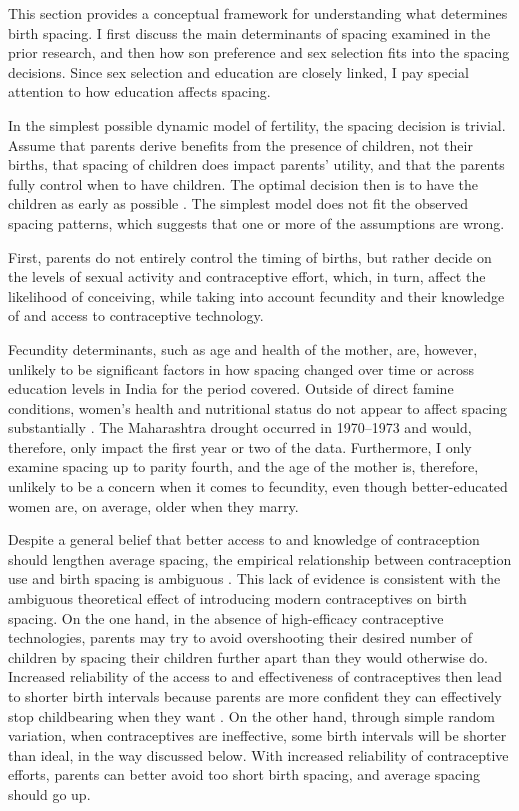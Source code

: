 \documentclass[12pt,letterpaper]{article}
\begin{document}
This section provides a conceptual framework for understanding what determines  
birth spacing.
I first discuss the main determinants of spacing examined in the prior research, and 
then how son preference and sex selection fits into the spacing decisions.
Since sex selection and education are closely linked, I pay special attention to how 
education affects spacing.

In the simplest possible dynamic model of fertility, the spacing decision is trivial.
Assume that parents derive benefits from the presence of children, not their births, 
that spacing of children does impact parents' utility, 
and that the parents fully control when to have children. 
The optimal decision then is to have the children as early as possible 
\citep{Newman1988}.
The simplest model does not fit the observed spacing patterns, which suggests 
that one or more of the assumptions are wrong.

First, parents do not entirely control the timing of births, but rather decide on 
the levels of sexual activity and contraceptive effort, which, in turn, affect the 
likelihood of conceiving, while taking into account fecundity and their knowledge 
of and access to contraceptive technology.

Fecundity determinants, such as age and health of the mother, are, however, unlikely 
to be significant factors in how spacing changed over time or across education levels 
in India for the period covered.
Outside of direct famine conditions, women's health and nutritional status do not 
appear to affect spacing substantially \citep{Huffman1987,John1987,lindstrom99}.
The Maharashtra drought occurred in 1970--1973 and would, therefore, only impact the first
year or two of the data.
Furthermore, I only examine spacing up to parity fourth, and the age of the mother is,
therefore, unlikely to be a concern when it comes to fecundity, even though 
better-educated women are, on average, older when they marry. 

Despite a general belief that better access to and knowledge of contraception 
should lengthen average spacing, the empirical relationship between contraception 
use and birth spacing is ambiguous 
\citep{Tulasidhar1993,Whitworth2002,Bhalotra2008,Yeakey2009,Kim2010,Soest2018}.
This lack of evidence is consistent with the ambiguous theoretical effect of introducing 
modern contraceptives on birth spacing.
On the one hand, in the absence of high-efficacy contraceptive technologies, parents may 
try to avoid overshooting their desired number of children by spacing their children 
further apart than they would otherwise do.
Increased reliability of the access to and effectiveness of contraceptives then lead to 
shorter birth intervals because parents are more confident they can effectively
stop childbearing when they want \citep{Keyfitz1971,Heckman1976}.
On the other hand, through simple random variation, when contraceptives are ineffective, 
some birth intervals will be shorter than ideal, in the way discussed below.
With increased reliability of contraceptive efforts, parents can better avoid too short 
birth spacing, and average spacing should go up.
\end{document}

